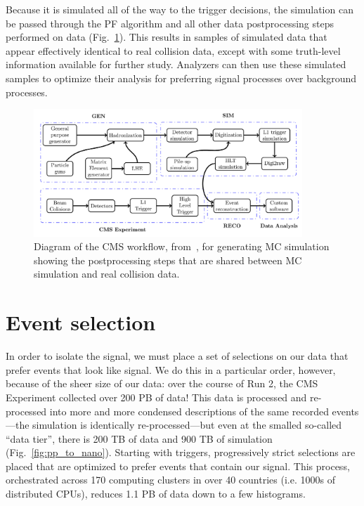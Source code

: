 Because it is simulated all of the way to the trigger decisions, the simulation can be passed through the PF algorithm and all other data postprocessing steps performed on data (Fig.~\ref{fig:mcgen_diagram}). 
This results in samples of simulated data that appear effectively identical to real collision data, except with some truth-level information available for further study. 
Analyzers can then use these simulated samples to optimize their analysis for preferring signal processes over background processes.

\begin{figure}[htb]
    \centering
    \includegraphics[width=0.9\textwidth]{fig/cms/mcgen_diagram.png}
    \caption{
        Diagram of the CMS workflow, from~\cite{CMSOpenDataMC}, for generating MC simulation showing the postprocessing steps that are shared between MC simulation and real collision data. 
    }
    \label{fig:mcgen_diagram}
\end{figure}

\section{Event selection}
In order to isolate the signal, we must place a set of selections on our data that prefer events that look like signal. 
We do this in a particular order, however, because of the sheer size of our data: over the course of Run 2, the CMS Experiment collected over 200 PB of data! 
This data is processed and re-processed into more and more condensed descriptions of the same recorded events---the simulation is identically re-processed---but even at the smalled so-called ``data tier'', there is 200 TB of data and 900 TB of simulation (Fig.~\ref{fig:pp_to_nano}). 
Starting with triggers, progressively strict selections are placed that are optimized to prefer events that contain our signal. 
This process, orchestrated across 170 computing clusters in over 40 countries (i.e. 1000s of distributed CPUs), reduces 1.1 PB of data down to a few histograms. %

